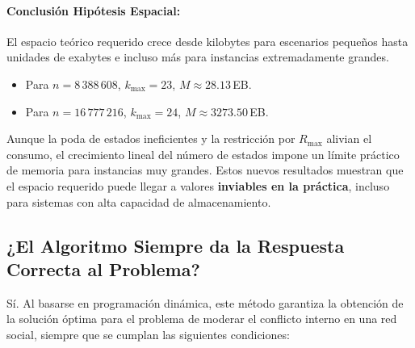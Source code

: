 \documentclass[11pt,letter]{article}
\begin{document}
    \paragraph{Conclusión Hipótesis Espacial:}
    El espacio teórico requerido crece desde kilobytes para escenarios pequeños hasta unidades de exabytes e incluso más para instancias extremadamente grandes.

    \begin{itemize}
      \item Para \(n=8\,388\,608\), \(k_{\max}=23\), \(M\approx28.13\)\,EB.
      \item Para \(n=16\,777\,216\), \(k_{\max}=24\), \(M\approx3273.50\)\,EB.
    \end{itemize}

    Aunque la poda de estados ineficientes y la restricción por \(R_{\max}\) alivian el consumo, el crecimiento lineal del número de estados impone un límite práctico de memoria para instancias muy grandes. Estos nuevos resultados muestran que el espacio requerido puede llegar a valores \textbf{inviables en la práctica}, incluso para sistemas con alta capacidad de almacenamiento.

    \subsection{¿El Algoritmo Siempre da la Respuesta Correcta al Problema?}


    Sí. Al basarse en programación dinámica, este método garantiza la obtención de la solución óptima para el problema de moderar el conflicto interno en una red social, siempre que se cumplan las siguientes condiciones:
\end{document}
